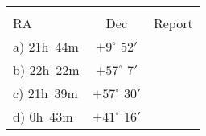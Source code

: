 \begin{center}
\begin{tabular}{lcc} \hline \\ [-6pt]
 \hspace{1.5cm}  RA \hspace{1cm} & Dec \hspace{1cm}& \hspace{3cm}Report\hspace{3cm} \\ [6pt]
\hline
a) 21h~44m  & $+9^\circ$ 52$'$ &     \\ \hline %
b) 22h~22m  & $+57^\circ$ 7$'$ &     \\ \hline %
c) 21h~39m  & $+57^\circ$ 30$'$ &  \\ \hline %
d) 0h~43m   & $+41^\circ$ 16$'$ &    \\ \hline %
  \end{tabular}
\end{center}
